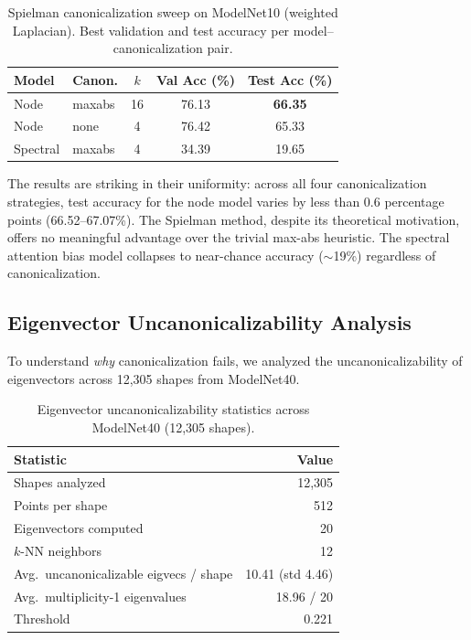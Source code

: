 \documentclass[11pt]{article}
\begin{document}
\begin{table}[ht]
\centering
\caption{Spielman canonicalization sweep on ModelNet10 (weighted Laplacian). Best
validation and test accuracy per model--canonicalization pair.}
\label{tab:sweep_weighted}
\footnotesize
\begin{tabular}{llccc}
\toprule
\textbf{Model} & \textbf{Canon.} & \textbf{$k$} & \textbf{Val Acc (\%)} & \textbf{Test Acc (\%)} \\
\midrule
Node & maxabs & 16 & 76.13 & \textbf{66.35} \\
Node & none & 4 & 76.42 & 65.33 \\
\midrule
Spectral & maxabs & 4 & 34.39 & 19.65 \\
\bottomrule
\end{tabular}
\end{table}

The results are striking in their uniformity: across all four canonicalization strategies,
test accuracy for the node model varies by less than 0.6 percentage points (66.52--67.07\%).
The Spielman method, despite its theoretical motivation, offers no meaningful advantage over
the trivial max-abs heuristic. The spectral attention bias model collapses to near-chance
accuracy (${\sim}$19\%) regardless of canonicalization.

\subsection{Eigenvector Uncanonicalizability Analysis}
\label{sec:uncanon}

To understand \emph{why} canonicalization fails, we analyzed the uncanonicalizability of
eigenvectors across 12,305 shapes from ModelNet40.

\begin{table}[ht]
\centering
\caption{Eigenvector uncanonicalizability statistics across ModelNet40 (12,305 shapes).}
\label{tab:uncanon}
\begin{tabular}{lr}
\toprule
\textbf{Statistic} & \textbf{Value} \\
\midrule
Shapes analyzed & 12,305 \\
Points per shape & 512 \\
Eigenvectors computed & 20 \\
$k$-NN neighbors & 12 \\
Avg.\ uncanonicalizable eigvecs / shape & 10.41 (std 4.46) \\
Avg.\ multiplicity-1 eigenvalues & 18.96 / 20 \\
Threshold & 0.221 \\
\bottomrule
\end{tabular}
\end{table}
\end{document}
